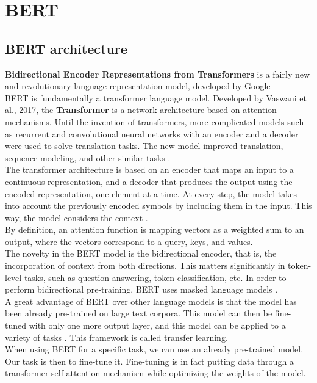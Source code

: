 \documentclass[times, utf8, zavrsni, english]{fer}
\begin{document}
\section{BERT}
\subsection{BERT architecture}
\textbf{Bidirectional Encoder Representations from Transformers} is a fairly new and revolutionary language representation model, developed by Google \citep{47751} \\
BERT is fundamentally a transformer language model.
Developed by Vaswani et al., 2017, the \textbf{Transformer} is a network architecture based on attention mechanisms. Until the invention of transformers, more complicated models such as recurrent and convolutional neural networks with an encoder and a decoder were used to solve translation tasks. The new model improved translation, sequence modeling, and other similar tasks \citep{vaswani}. \\
The transformer architecture is based on an encoder that maps an input to a continuous representation, and a decoder that produces the output using the encoded representation, one element at a time. At every step, the model takes into account the previously encoded symbols by including them in the input. This way, the model considers the context \citep{vaswani}. \\
By definition, an attention function is mapping vectors as a weighted sum to an output, where the vectors correspond to a query, keys, and values. \\
The novelty in the BERT model is the bidirectional encoder, that is, the incorporation of context from both directions. This matters significantly in token-level tasks, such as question answering, token classification, etc. In order to perform bidirectional pre-training, BERT uses masked language models \citep{47751}. \\
A great advantage of BERT over other language models is that the model has been already pre-trained on large text corpora. This model can then be fine-tuned with only one more output layer, and this model can be applied to a variety of tasks \citep{47751}. This framework is called transfer learning. \\
When using BERT for a specific task, we can use an already pre-trained model. Our task is then to fine-tune it.
Fine-tuning is in fact putting data through a transformer self-attention mechanism while optimizing the weights of the model.
\end{document}
